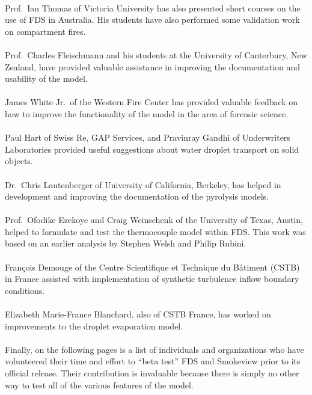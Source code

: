 \documentclass[11pt]{book}
\begin{document}
\\
\noindent Prof.~Ian Thomas of Victoria University has also presented short courses on the use of FDS in Australia.
His students have also performed some validation work on compartment fires.\\
\\
\noindent Prof.~Charles Fleischmann and his students at the University of Canterbury, New Zealand, have provided valuable assistance
in improving the documentation and usability of the model.\\
\\
\noindent James White Jr.~of the Western Fire Center has provided valuable feedback on how to
improve the functionality of the model in the area of forensic science.\\
\\
\noindent Paul Hart of Swiss Re, GAP Services, and Pravinray Gandhi of Underwriters Laboratories provided useful suggestions about
water droplet transport on solid objects.\\
\\
\noindent Dr.~Chris Lautenberger of University of California, Berkeley, has helped in development and improving the documentation of the pyrolysis models.\\
\\
\noindent Prof.~Ofodike Ezekoye and Craig Weinschenk of the University of Texas, Austin, helped to formulate and test the thermocouple model within FDS. This work was based on an earlier analysis by Stephen Welsh and Philip Rubini.\\
\\
\noindent Fran\c{c}ois Demouge of the Centre Scientifique et Technique du B\^{a}timent (CSTB) in France assisted with implementation of synthetic turbulence inflow boundary conditions.\\
\\
\noindent Elizabeth Marie-France Blanchard, also of CSTB France, has worked on improvements to the droplet evaporation model.\\
\\
\noindent Finally, on the following pages is a list of individuals and organizations who have volunteered their time and effort to
``beta test'' FDS and Smokeview prior to its official release. Their contribution is invaluable because there is simply no other way
to test all of the various features of the model.

\newpage
\end{document}
